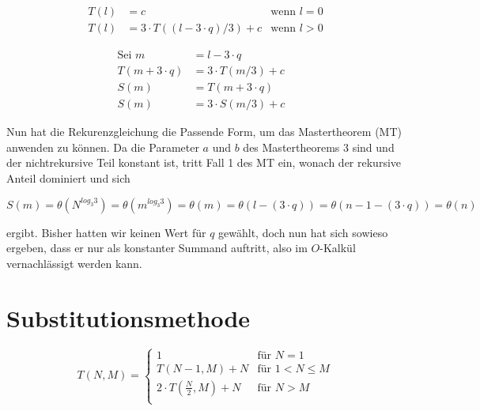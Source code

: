 \documentclass[parskip=half,a4paper]{scrartcl}
\begin{document}
\begin{equation}
\begin{aligned}
T\left(l\right) & = c & \text{wenn $l = 0$} \\
T\left(l\right) & = 3 \cdot T\left(\left(l - 3 \cdot q\right) / 3\right) + c & \text{wenn $l > 0$}
\end{aligned}
\end{equation}



\begin{equation}
\begin{aligned}
\text{Sei $m$} & = l - 3 \cdot q &\\
T\left(m + 3 \cdot q\right) &= 3 \cdot T\left(m / 3\right) + c  \\
S\left(m\right) & = T\left(m + 3 \cdot q\right) \\
S\left(m\right) & = 3 \cdot S\left(m / 3\right) + c
\end{aligned}
\end{equation}

Nun hat die Rekurenzgleichung die Passende Form, um das Mastertheorem (MT)
anwenden zu können. Da die Parameter $a$ und $b$ des Mastertheorems 3 sind und der
nichtrekursive Teil konstant ist, tritt Fall 1 des MT ein, wonach der rekursive
Anteil dominiert und sich

$$
S\left(m\right) = \theta\left(N^{log_3{3}}\right)= \theta\left(m^{log_3{3}}\right) = \theta\left(m\right) = \theta\left(l - \left(3 \cdot q\right)\right) = \theta\left(n - 1 - \left(3 \cdot q\right)\right) = \theta\left(n\right)
$$

ergibt. Bisher hatten wir keinen Wert für $q$ gewählt, doch nun hat sich sowieso ergeben, dass er nur als konstanter Summand auftritt, also im $O$-Kalkül vernachlässigt werden kann.


\section*{Substitutionsmethode}

\begin{equation}
    T\left(N, M\right) =
\begin{cases}
    1 & \text{für $N = 1$}\\
    T\left(N-1, M\right) + N & \text{für $1 < N \le M$} \\
    2 \cdot T\left(\frac{N}{2}, M\right) + N & \text{für $N > M$} \\
\end{cases}
\end{equation}
\end{document}
